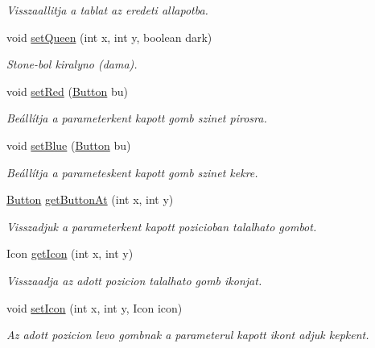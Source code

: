 \begin{DoxyCompactItemize}
\begin{DoxyCompactList}\small\item\em Visszaallitja a tablat az eredeti allapotba. \end{DoxyCompactList}\item 
void \hyperlink{classview_1_1_checkers_view_a6aba0221126505b6647d0e3265bd1d93}{set\+Queen} (int x, int y, boolean dark)
\begin{DoxyCompactList}\small\item\em Stone-\/bol kiralyno (dama). \end{DoxyCompactList}\item 
void \hyperlink{classview_1_1_checkers_view_a7ed18b58b6aad5b1aafe96c26e5941ca}{set\+Red} (\hyperlink{classview_1_1_button}{Button} bu)
\begin{DoxyCompactList}\small\item\em Beállítja a parameterkent kapott gomb szinet pirosra. \end{DoxyCompactList}\item 
void \hyperlink{classview_1_1_checkers_view_a0fb36a93cfc88b8a844df820fdf0dc11}{set\+Blue} (\hyperlink{classview_1_1_button}{Button} bu)
\begin{DoxyCompactList}\small\item\em Beállítja a parameteskent kapott gomb szinet kekre. \end{DoxyCompactList}\item 
\hyperlink{classview_1_1_button}{Button} \hyperlink{classview_1_1_checkers_view_a0cec5bc3e85bb43da33dc98bb84cb618}{get\+Button\+At} (int x, int y)
\begin{DoxyCompactList}\small\item\em Visszadjuk a parameterkent kapott pozicioban talalhato gombot. \end{DoxyCompactList}\item 
Icon \hyperlink{classview_1_1_checkers_view_a4193841f5fe3bf1a4345d947630eac82}{get\+Icon} (int x, int y)
\begin{DoxyCompactList}\small\item\em Visszaadja az adott pozicion talalhato gomb ikonjat. \end{DoxyCompactList}\item 
void \hyperlink{classview_1_1_checkers_view_aaa2497d67e7b4ff8def470ce78068ff7}{set\+Icon} (int x, int y, Icon icon)
\begin{DoxyCompactList}\small\item\em Az adott pozicion levo gombnak a parameterul kapott ikont adjuk kepkent. \end{DoxyCompactList}\item 

\end{DoxyCompactItemize}
